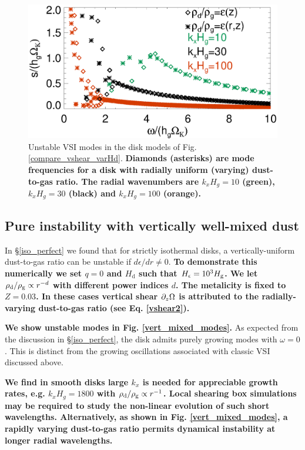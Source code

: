 \begin{figure}
  \includegraphics[width=\linewidth]{figures/compare_eigenvals_varHd} 
  \caption{Unstable VSI modes in the disk models of
    Fig. \protect\ref{compare_vshear_varHd}. {\bf Diamonds (asterisks) 
    are mode frequencies for a disk with radially uniform (varying)
    dust-to-gas ratio. The radial wavenumbers are $k_xH_g = 10$
    (green),$k_xH_g = 30$ (black) and $k_xH_g = 100$ (orange). }
    \label{vsi_dust_varHd}
    }
\end{figure}

\subsection{Pure instability with vertically well-mixed
  dust}\label{vert_mixed} 

In \S\ref{iso_perfect} we found that for strictly isothermal
disks, a vertically-uniform dust-to-gas ratio can be unstable
if $d\epsilon/dr\neq0$.   
{\bf
To demonstrate this numerically we set $q=0$ and $H_\mathrm{d}$ such
that $H_\epsilon=10^3H_\mathrm{g}$. We let $\rho_\mathrm{d}/\rho_\mathrm{g} \propto r^{-d}$
with different power indices $d$. The metalicity is fixed to $Z=0.03$.  
In these cases vertical shear $\partial_z\Omega$ is 
attributed to the radially-varying dust-to-gas ratio (see
Eq. \ref{vshear2}).    
}

{\bf We show unstable modes in 
Fig. \ref{vert_mixed_modes}.} 
As expected from the discussion in
\S\ref{iso_perfect}, the disk admits purely growing modes with
$\omega=0$. This is distinct from the growing oscillations associated
with classic VSI discussed above. 

{\bf We find in smooth disks large 
  $k_x$ is needed for appreciable growth rates, e.g. $k_xH_g=1800$
  with $\rho_\mathrm{d}/\rho_\mathrm{g}\propto r^{-1}$. 
  Local shearing box simulations \citep[e.g.][]{bai10b,yang16} may 
  be required to study the non-linear evolution of such short 
  wavelengths. Alternatively, as shown in Fig. \ref{vert_mixed_modes},
  a rapidly varying dust-to-gas ratio permits dynamical instability at
  longer radial wavelengths. 
}

